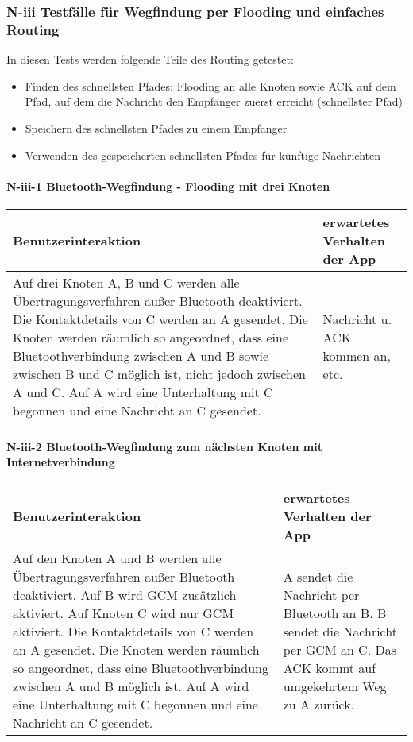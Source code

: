 \subsubsection{N-iii Testfälle für Wegfindung per Flooding und einfaches Routing}

In diesen Tests werden folgende Teile des Routing getestet:

\begin{itemize}
  \item Finden des schnellsten Pfades: Flooding an alle Knoten sowie ACK auf dem Pfad, auf dem die Nachricht den Empfänger zuerst erreicht (schnellster Pfad)
  \item Speichern des schnellsten Pfades zu einem Empfänger
  \item Verwenden des gespeicherten schnellsten Pfades für künftige Nachrichten
\end{itemize}

\paragraph{N-iii-1 Bluetooth-Wegfindung - Flooding mit drei Knoten}

\begin{longtable}{p{8cm}p{8.5cm}}
\toprule
Benutzerinteraktion & erwartetes Verhalten der App\tabularnewline
\midrule
\endhead
Auf drei Knoten A, B und C werden alle Übertragungsverfahren außer
Bluetooth deaktiviert. Die Kontaktdetails von C werden an A gesendet.
Die Knoten werden räumlich so angeordnet, dass eine Bluetoothverbindung
zwischen A und B sowie zwischen B und C möglich ist, nicht jedoch
zwischen A und C. Auf A wird eine Unterhaltung mit C begonnen und eine
Nachricht an C gesendet. & Nachricht u. ACK kommen an,
etc.\tabularnewline
\bottomrule
\end{longtable}

\paragraph{N-iii-2 Bluetooth-Wegfindung zum nächsten Knoten mit Internetverbindung}

\begin{longtable}{p{8cm}p{8.5cm}}
\toprule
Benutzerinteraktion & erwartetes Verhalten der App\tabularnewline
\midrule
\endhead
Auf den Knoten A und B werden alle Übertragungsverfahren außer Bluetooth deaktiviert. 
Auf B wird GCM zusätzlich aktiviert. Auf Knoten C wird nur GCM aktiviert. 
Die Kontaktdetails von C werden an A gesendet. 
Die Knoten werden räumlich so angeordnet, dass eine Bluetoothverbindung zwischen A und B möglich ist. 
Auf A wird eine Unterhaltung mit C begonnen und eine Nachricht an C gesendet.
& A sendet die Nachricht per Bluetooth an B.
B sendet die Nachricht per GCM an C. 
Das ACK kommt auf umgekehrtem Weg zu A zurück.\tabularnewline
\bottomrule
\end{longtable}

